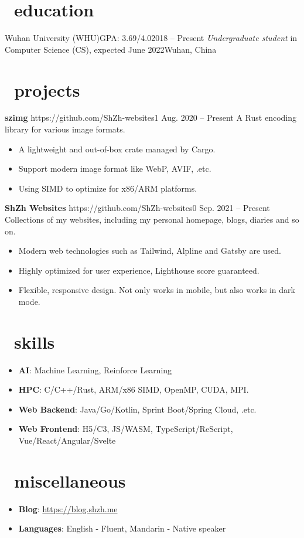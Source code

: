 \documentclass{common}
\begin{document}

\section{\faGraduationCap\ education}
\educationsubsection
    {Wuhan University (WHU)}{GPA: 3.69/4.0}{2018 -- Present}
    {\textit{Undergraduate student} in Computer Science (CS), expected June 2022}{Wuhan, China}

\section{\faCubes\ projects}
\projectsubsection
    {\textbf{szimg}}
    {https://github.com/ShZh-websites}{1}
    {Aug. 2020 -- Present}
A Rust encoding library for various image formats.
\begin{itemize}
    \item A lightweight and out-of-box crate managed by Cargo.
    \item Support modern image format like WebP, AVIF, .etc.
    \item Using SIMD to optimize for x86/ARM platforms.
\end{itemize}
\projectsubsection
    {\textbf{ShZh Websites}}
    {https://github.com/ShZh-websites}{0}
    {Sep. 2021 -- Present}
Collections of my websites, including my personal homepage, blogs, diaries and so on.
\begin{itemize}
    \item Modern web technologies such as Tailwind, Alpline and Gatsby are used.
    \item Highly optimized for user experience, Lighthouse score guaranteed.
    \item Flexible, responsive design. Not only works in mobile, but also works in dark mode.
\end{itemize}

\section{\faCogs\ skills}
\begin{itemize}[parsep=0.5ex]
    \item \textbf{AI}: Machine Learning, Reinforce Learning
    \item \textbf{HPC}: C/C++/Rust, ARM/x86 SIMD, OpenMP, CUDA, MPI.
    \item \textbf{Web Backend}: Java/Go/Kotlin, Sprint Boot/Spring Cloud, .etc.
    \item \textbf{Web Frontend}: H5/C3, JS/WASM, TypeScript/ReScript, Vue/React/Angular/Svelte
\end{itemize}

\section{\faInfo\ miscellaneous}
\begin{itemize}[parsep=0.5ex]
    \item \textbf{Blog}: \href{https://blog.shzh.me}{https://blog.shzh.me}
    \item \textbf{Languages}: English - Fluent, Mandarin - Native speaker
\end{itemize}
\end{document}
